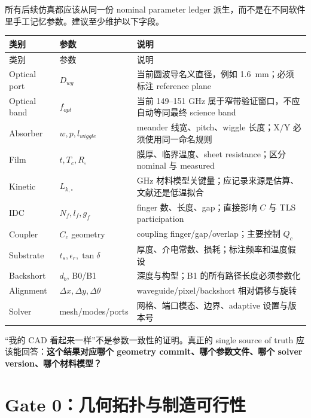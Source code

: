 \documentclass[11pt,a4paper,openany]{ctexrep}
\begin{document}
所有后续仿真都应该从同一份 nominal parameter ledger 派生，而不是在不同软件里手工记忆参数。建议至少维护以下字段。

\begin{longtable}{p{3.0cm}p{3.0cm}p{7.4cm}}
\toprule
类别 & 参数 & 说明 \\
\midrule
\endfirsthead
\toprule
类别 & 参数 & 说明 \\
\midrule
\endhead
Optical port & $D_{wg}$ & 当前圆波导名义直径，例如 \SI{1.6}{mm}；必须标注 reference plane \\
Optical band & $f_{opt}$ & 当前 149--151 GHz 属于窄带验证窗口，不应自动等同最终 science band \\
Absorber & $w,p,l_{wiggle}$ & meander 线宽、pitch、wiggle 长度；X/Y 必须使用同一命名规则 \\
Film & $t,T_c,R_\square$ & 膜厚、临界温度、sheet resistance；区分 nominal 与 measured \\
Kinetic & $L_{k,\square}$ & GHz 材料模型关键量；应记录来源是估算、文献还是低温拟合 \\
IDC & $N_f,l_f,g_f$ & finger 数、长度、gap；直接影响 $C$ 与 TLS participation \\
Coupler & $C_c$ geometry & coupling finger/gap/overlap；主要控制 $Q_c$ \\
Substrate & $t_s,\epsilon_r,\tan\delta$ & 厚度、介电常数、损耗；标注频率和温度假设 \\
Backshort & $d_b$, B0/B1 & 深度与构型；B1 的所有路径长度必须参数化 \\
Alignment & $\Delta x,\Delta y,\Delta\theta$ & waveguide/pixel/backshort 相对偏移与旋转 \\
Solver & mesh/modes/ports & 网格、端口模态、边界、adaptive 设置与版本号 \\
\bottomrule
\end{longtable}

\begin{mistakebox}
“我的 CAD 看起来一样”不是参数一致性的证明。真正的 single source of truth 应该能回答：\textbf{这个结果对应哪个 geometry commit、哪个参数文件、哪个 solver version、哪个材料模型？}
\end{mistakebox}

\section{Gate 0：几何拓扑与制造可行性}
\end{document}

